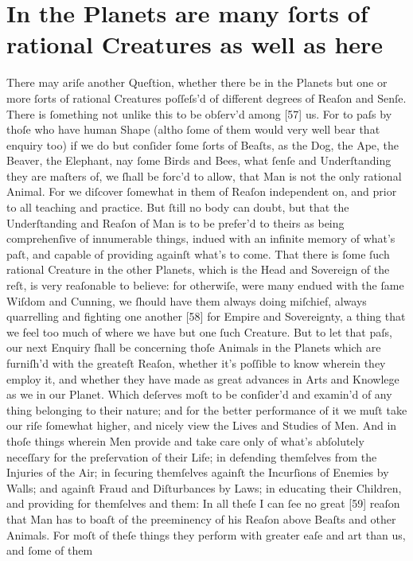 \documentclass[letterpaper]{book}
\begin{document}
\section{In the Planets are many ſorts of rational Creatures as well as here}

There may ariſe another Queſtion, whether there be in the Planets but one or
more ſorts of rational Creatures poſſeſs'd of different degrees of Reaſon
and Senſe. There is ſomething not unlike this to be obſerv'd among [57] us.
For to paſs by thoſe who have human Shape (altho ſome of them would very
well bear that enquiry too) if we do but conſider ſome ſorts of Beaſts, as
the Dog, the Ape, the Beaver, the Elephant, nay ſome Birds and Bees, what
ſenſe and Underſtanding they are maſters of, we ſhall be forc'd to allow,
that Man is not the only rational Animal. For we diſcover ſomewhat in them
of Reaſon independent on, and prior to all teaching and practice.  But ſtill
no body can doubt, but that the Underſtanding and Reaſon of Man is to be
prefer'd to theirs as being comprehenſive of innumerable things, indued with
an infinite memory of what's paſt, and capable of providing againſt what's
to come. That there is ſome ſuch rational Creature in the other Planets,
which is the Head and Sovereign of the reſt, is very reaſonable to believe:
for otherwiſe, were many endued with the ſame Wiſdom and Cunning, we ſhould
have them always doing miſchief, always quarrelling and fighting one another
[58] for Empire and Sovereignty, a thing that we feel too much of where we
have but one ſuch Creature. But to let that paſs, our next Enquiry ſhall be
concerning thoſe Animals in the Planets which are furniſh'd with the
greateſt Reaſon, whether it's poſſible to know wherein they employ it, and
whether they have made as great advances in Arts and Knowlege as we in our
Planet. Which deſerves moſt to be conſider'd and examin'd of any thing
belonging to their nature; and for the better performance of it we muſt take
our riſe ſomewhat higher, and nicely view the Lives and Studies of Men.  And
in thoſe things wherein Men provide and take care only of what's abſolutely
neceſſary for the preſervation of their Life; in defending
themſelves from the Injuries of the Air; in ſecuring themſelves againſt the
Incurſions of Enemies by Walls; and againſt Fraud and Diſturbances by Laws;
in educating their Children, and providing for themſelves and them: In all
theſe I can ſee no great [59] reaſon that Man has to boaſt of the
preeminency of his Reaſon above Beaſts and other Animals. For moſt of theſe
things they perform with greater eaſe and art than us, and ſome of them
\end{document}

